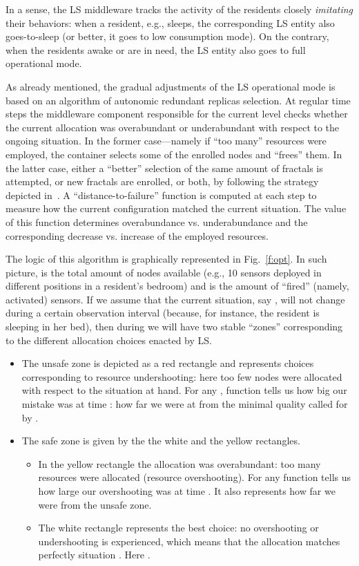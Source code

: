 \documentclass[twocolumn]{svjour3}
\begin{document}
In a sense, the LS middleware
tracks the activity of the residents closely \emph{imitating\/}  their behaviors: when a resident,
e.g., sleeps, the
corresponding LS entity also goes-to-sleep (or better, it goes to low consumption mode).
On the contrary, when the residents awake or are in need, the
LS entity also goes to full operational mode.

As already mentioned,
the gradual adjustments of the LS operational mode is based on an algorithm of autonomic redundant replicas selection.
At regular time steps the middleware component responsible for the current level
checks whether the current allocation was overabundant or underabundant
with respect to the ongoing situation. In the former case---namely if ``too many'' resources were employed,
the container selects some of the enrolled nodes and ``frees'' them. In the latter case,
either a ``better'' selection
of the same amount of fractals is attempted, or new fractals are enrolled, or both, by
following the strategy depicted in~\cite{BDB11a,BDFB12}.
A ``distance-to-failure'' function
is computed at each step to measure how the current configuration matched the current situation. The value of this
function determines overabundance vs. underabundance and the corresponding decrease vs. increase of the employed resources.

The logic of this algorithm is graphically represented in Fig.~\ref{f:opt}. In such picture,
 is the total amount of nodes
available (e.g., 10 sensors deployed in different positions in a resident's bedroom)
and  is the amount of
``fired'' (namely, activated) sensors. If we assume that the current
situation, say , will not change during a certain observation interval  (because, for instance, the resident is
sleeping in her bed), then during  we will have two stable ``zones'' corresponding to the different
allocation choices enacted by LS.
\begin{itemize}
	\item The unsafe zone is depicted as a red rectangle and represents choices corresponding
		to resource undershooting:
		here too few nodes were allocated with respect to the situation at hand.
		For any ,
		function  tells us how big our mistake was at time : how far we were at  
		from the minimal quality called for by .
	\item The safe zone is given by the the white and the yellow rectangles.
		\begin{itemize}
		\item In the yellow rectangle
		the allocation was overabundant: too many resources were allocated (resource overshooting).
		For any  function  tells us how large our overshooting was at time .
		It also represents how far we were from the unsafe zone.
		\item The white rectangle represents the best choice: no overshooting or undershooting
			is experienced, which means that
			the allocation matches perfectly situation .
			Here .
	\end{itemize}
\end{itemize}
\end{document}
